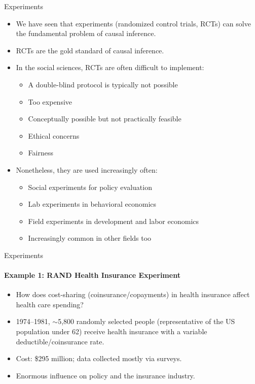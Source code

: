 \documentclass[11pt,aspectratio=169]{beamer}
\begin{document}
\begin{frame}{Experiments}
  \begin{itemize}
    \item We have seen that experiments (randomized control trials, RCTs) can solve the fundamental problem of causal inference.
    \item RCTs are the gold standard of causal inference.
    \item In the social sciences, RCTs are often difficult to implement:
    \begin{itemize}
      \item A double-blind protocol is typically not possible
      \item Too expensive
      \item Conceptually possible but not practically feasible
      \item Ethical concerns
      \item Fairness
    \end{itemize}
    \vspace{0.3em}
    \item Nonetheless, they are used increasingly often:
    \begin{itemize}
      \item Social experiments for policy evaluation
      \item Lab experiments in behavioral economics
      \item Field experiments in development and labor economics
      \item Increasingly common in other fields too
    \end{itemize}
  \end{itemize}
\end{frame}

\begin{frame}{Experiments}
  \framesubtitle{Example 1: RAND Health Insurance Experiment}
  \begin{itemize}
    \item How does cost-sharing (coinsurance/copayments) in health insurance affect health care spending?
    \item 1974--1981, $\sim$5{,}800 randomly selected people (representative of the US population under 62) receive health insurance with a variable deductible/coinsurance rate.
    \item Cost: \$295 million; data collected mostly via surveys.
    \item Enormous influence on policy and the insurance industry.
  \end{itemize}
\end{frame}
\end{document}
